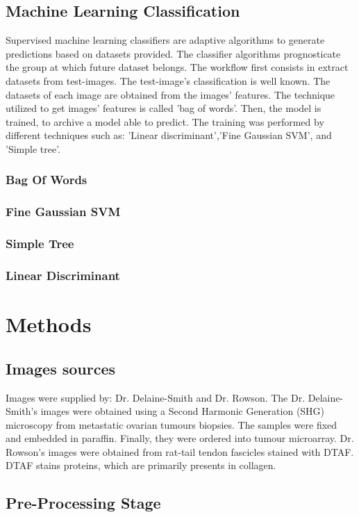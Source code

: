 \documentclass[12pt,a4paper]{article}
\begin{document}
\subsection{Machine Learning Classification}
Supervised machine learning classifiers are adaptive algorithms to generate predictions based on datasets provided. The classifier algorithms prognosticate the group at which future dataset belongs.  The workflow first consists in extract datasets from test-images. The test-image's classification is well known. The datasets of each image are obtained from the images' features. The technique utilized to get images' features is called 'bag of words'. Then, the model is trained, to archive a model able to predict. The training was performed by different techniques such as: 'Linear discriminant','Fine Gaussian SVM', and 'Simple tree'. 
\subsubsection{Bag Of Words}
\subsubsection{Fine Gaussian SVM}
\subsubsection{Simple Tree}
\subsubsection{Linear Discriminant}

\section{Methods}
\subsection{Images sources}
Images were supplied by: Dr. Delaine-Smith and Dr. Rowson. The  Dr. Delaine-Smith's images were obtained using a Second Harmonic Generation (SHG) microscopy from metastatic ovarian tumours biopsies. The samples were fixed and  embedded in paraffin. Finally, they were ordered into tumour microarray.  Dr. Rowson's images were obtained from rat-tail tendon fascicles stained with DTAF. DTAF stains proteins, which are primarily presents in collagen.

\subsection{Pre-Processing Stage}
\end{document}
